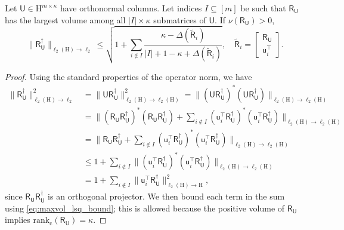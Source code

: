 \documentclass[onefignum,onetabnum]{siamart250211}
\renewenvironment{equation*}{\[}{\]\ignorespacesafterend}
\newcommand{\Hilb}{\mathrm{H}}
\newcommand{\Batrix}[1]{\bm{\Matrix{#1}}}
\newcommand{\Matrix}[1]{\mathsf{#1}}
\newcommand{\trans}{\intercal}
\newcommand{\pinv}{\dagger}
\newcommand{\Rank}[3][]{\mathrm{rank_{#2}} #1( #3 #1)}
\newcommand{\Index}[1]{{#1}}
\newcommand{\Norm}[3][]{#1\| #2 #1\|_{\mathrm{#3}}}
\begin{document}
\begin{theorem}
\label{theorem:maxvol_pinv_bound}
Let $\Batrix{U} \in \Hilb^{m \times \kappa}$ have orthonormal columns.
Let indices $\Index{I} \subseteq [m]$ be such that $\Batrix{R}_{\Batrix{U}}$ has the largest volume among all $|\Index{I}| \times \kappa$ submatrices of $\Batrix{U}$.
If $\nu(\Batrix{R}_{\Batrix{U}}) > 0$,
\begin{equation*}
    \Norm{\Batrix{R}_{\Batrix{U}}^\pinv}{\ell_2(\Hilb) \to \ell_2} \leq \sqrt{1 + \sum_{i \not\in \Index{I}} \frac{\kappa - \Delta(\tilde{\Batrix{R}}_{i})}{|\Index{I}| + 1 - \kappa + \Delta(\tilde{\Batrix{R}}_{i})}}, \quad \tilde{\Batrix{R}}_{i} = \begin{bmatrix}
        \Batrix{R}_{\Batrix{U}} \\
        \Batrix{u}_{i}^\trans
    \end{bmatrix}.
\end{equation*}
\end{theorem}
\begin{proof}
Using the standard properties of the operator norm, we have
\begin{align*}
    \Norm{\Batrix{R}_{\Batrix{U}}^\pinv}{\ell_2(\Hilb) \to \ell_2}^2 &= \Norm{\Batrix{U} \Batrix{R}_{\Batrix{U}}^\pinv}{\ell_2(\Hilb) \to \ell_2(\Hilb)}^2 = \Norm{(\Batrix{U} \Batrix{R}_{\Batrix{U}}^\pinv)^\ast (\Batrix{U} \Batrix{R}_{\Batrix{U}}^\pinv)}{\ell_2(\Hilb) \to \ell_2(\Hilb)} \\
    &= \Norm[\bigg]{(\Batrix{R}_{\Batrix{U}} \Batrix{R}_{\Batrix{U}}^\pinv)^\ast (\Batrix{R}_{\Batrix{U}} \Batrix{R}_{\Batrix{U}}^\pinv) + \sum_{i \not\in \Index{I}} (\Batrix{u}_{i}^\trans \Batrix{R}_{\Batrix{U}}^\pinv)^\ast (\Batrix{u}_{i}^\trans \Batrix{R}_{\Batrix{U}}^\pinv)}{\ell_2(\Hilb) \to \ell_2(\Hilb)} \\
    &= \Norm[\bigg]{\Batrix{R}_{\Batrix{U}} \Batrix{R}_{\Batrix{U}}^\pinv + \sum_{i \not\in \Index{I}} (\Batrix{u}_{i}^\trans \Batrix{R}_{\Batrix{U}}^\pinv)^\ast (\Batrix{u}_{i}^\trans \Batrix{R}_{\Batrix{U}}^\pinv)}{\ell_2(\Hilb) \to \ell_2(\Hilb)}\\
    &\leq 1 + \sum_{i \not\in \Index{I}} \Norm{(\Batrix{u}_{i}^\trans \Batrix{R}_{\Batrix{U}}^\pinv)^\ast (\Batrix{u}_{i}^\trans \Batrix{R}_{\Batrix{U}}^\pinv)}{\ell_2(\Hilb) \to \ell_2(\Hilb)} \\
    &= 1 + \sum_{i \not\in \Index{I}} \Norm{\Batrix{u}_{i}^\trans \Batrix{R}_{\Batrix{U}}^\pinv}{\ell_2(\Hilb) \to \Hilb}^2,
\end{align*}
since $\Batrix{R}_{\Batrix{U}} \Batrix{R}_{\Batrix{U}}^\pinv$ is an orthogonal projector.
We then bound each term in the sum using \cref{eq:maxvol_lsq_bound}; this is allowed because the positive volume of $\Batrix{R}_{\Batrix{U}}$ implies $\Rank{c}{\Batrix{R}_{\Batrix{U}}} = \kappa$.
\end{proof}
\end{document}
